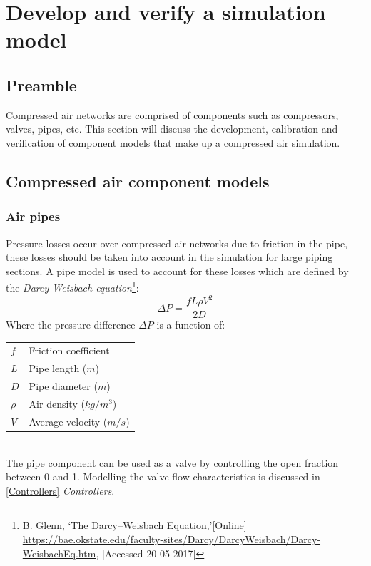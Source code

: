 \section{Develop and verify a simulation model}
	\subsection{Preamble}
	Compressed air networks are comprised of components such as compressors, valves, pipes, etc. This section will discuss the development, calibration and verification of component models that make up a compressed air simulation. 
	\subsection{Compressed air component models}
		\subsubsection{Air pipes}
		Pressure losses occur over compressed air networks due to friction in the pipe, these losses should be taken into account in the simulation for large piping sections. A pipe model is used to account for these losses which are defined by the \textit{Darcy-Weisbach equation}\footnote{ B. Glenn, \enquote*{The Darcy–Weisbach Equation,}[Online] \url{https://bae.okstate.edu/faculty-sites/Darcy/DarcyWeisbach/Darcy-WeisbachEq.htm}, [Accessed 20-05-2017]}:
		$$\Delta P = \frac{f  L \rho V^2}{2 D}$$
		Where the pressure difference $\Delta P $ is a function of:\\
		\begin{tabular}{p{1.3cm}p{13cm}}
		$f$ & Friction coefficient  \\
		$L$ & Pipe length ($m$) \\
		$D$ & Pipe diameter ($m$) \\
		$\rho$ & Air density ($kg/m^3$)\\	
		$V$ & Average velocity ($m/s$) \\
		\end{tabular} \\
		The pipe component can be used as a valve by controlling the open fraction between 0 and 1. Modelling the valve flow characteristics is discussed in \ref{Controllers} \textit{Controllers}.
